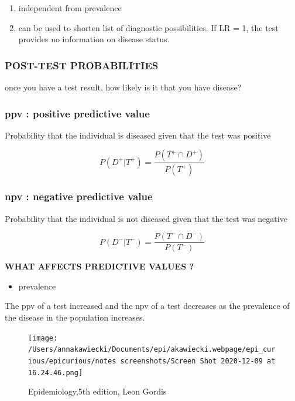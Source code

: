 \documentclass[
]{article}
\providecommand{\tightlist}{%
  \setlength{\itemsep}{0pt}\setlength{\parskip}{0pt}}
\begin{document}
\begin{enumerate}
\def\labelenumi{\arabic{enumi}.}
\item
  independent from prevalence
\item
  can be used to shorten list of diagnostic possibilities. If LR = 1,
  the test provides no information on disease status.
\end{enumerate}

\hypertarget{post-test-probabilities}{%
\subsubsection{POST-TEST PROBABILITIES}\label{post-test-probabilities}}

once you have a test result, how likely is it that you have disease?

\hypertarget{ppv-positive-predictive-value}{%
\subsubsection{ppv : positive predictive
value}\label{ppv-positive-predictive-value}}

Probability that the individual is diseased given that the test was
positive

\[P(D^+|T^+)= \frac{P(T^+ \cap D^+)}{P(T^+)}\]

\hypertarget{npv-negative-predictive-value}{%
\subsubsection{npv : negative predictive
value}\label{npv-negative-predictive-value}}

Probability that the individual is not diseased given that the test was
negative

\[P(D^-|T^-)= \frac{P(T^- \cap D^-)}{P(T^-)}\]

\textbf{WHAT AFFECTS PREDICTIVE VALUES ?}

\begin{itemize}
\tightlist
\item
  prevalence
\end{itemize}

The ppv of a test increased and the npv of a test decreases as the
prevalence of the disease in the population increases.

\begin{figure}
\centering
\texttt{[image: /Users/annakawiecki/Documents/epi/akawiecki.webpage/epi\_curious/epicurious/notes screenshots/Screen Shot 2020-12-09 at 16.24.46.png]}
\caption{Epidemiology,5th edition, Leon Gordis}
\end{figure}
\end{document}
